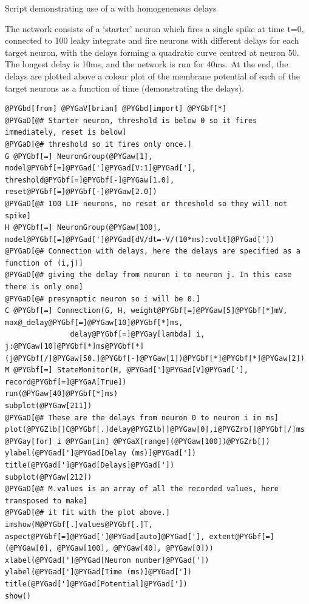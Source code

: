 \documentclass[letterpaper,10pt,english]{manual}
\begin{document}
Script demonstrating use of a \hyperlink{brian.Connection}{} with homogenenous delays

The network consists of a `starter' neuron which fires a single spike at time
t=0, connected to 100 leaky integrate and fire neurons with different delays
for each target neuron, with the delays forming a quadratic curve centred at
neuron 50. The longest delay is 10ms, and the network is run for 40ms. At
the end, the delays are plotted above a colour plot of the membrane potential
of each of the target neurons as a function of time (demonstrating the
delays).

\begin{Verbatim}[commandchars=@\[\]]
@PYGbd[from] @PYGaV[brian] @PYGbd[import] @PYGbf[*]
@PYGaD[@# Starter neuron, threshold is below 0 so it fires immediately, reset is below]
@PYGaD[@# threshold so it fires only once.]
G @PYGbf[=] NeuronGroup(@PYGaw[1], model@PYGbf[=]@PYGad[']@PYGad[V:1]@PYGad['], threshold@PYGbf[=]@PYGbf[-]@PYGaw[1.0], reset@PYGbf[=]@PYGbf[-]@PYGaw[2.0])
@PYGaD[@# 100 LIF neurons, no reset or threshold so they will not spike]
H @PYGbf[=] NeuronGroup(@PYGaw[100], model@PYGbf[=]@PYGad[']@PYGad[dV/dt=-V/(10*ms):volt]@PYGad['])
@PYGaD[@# Connection with delays, here the delays are specified as a function of (i,j)]
@PYGaD[@# giving the delay from neuron i to neuron j. In this case there is only one]
@PYGaD[@# presynaptic neuron so i will be 0.]
C @PYGbf[=] Connection(G, H, weight@PYGbf[=]@PYGaw[5]@PYGbf[*]mV, max@_delay@PYGbf[=]@PYGaw[10]@PYGbf[*]ms,
               delay@PYGbf[=]@PYGay[lambda] i, j:@PYGaw[10]@PYGbf[*]ms@PYGbf[*](j@PYGbf[/]@PYGaw[50.]@PYGbf[-]@PYGaw[1])@PYGbf[*]@PYGbf[*]@PYGaw[2])
M @PYGbf[=] StateMonitor(H, @PYGad[']@PYGad[V]@PYGad['], record@PYGbf[=]@PYGaA[True])
run(@PYGaw[40]@PYGbf[*]ms)
subplot(@PYGaw[211])
@PYGaD[@# These are the delays from neuron 0 to neuron i in ms]
plot(@PYGZlb[]C@PYGbf[.]delay@PYGZlb[]@PYGaw[0],i@PYGZrb[]@PYGbf[/]ms @PYGay[for] i @PYGan[in] @PYGaX[range](@PYGaw[100])@PYGZrb[])
ylabel(@PYGad[']@PYGad[Delay (ms)]@PYGad['])
title(@PYGad[']@PYGad[Delays]@PYGad['])
subplot(@PYGaw[212])
@PYGaD[@# M.values is an array of all the recorded values, here transposed to make]
@PYGaD[@# it fit with the plot above.]
imshow(M@PYGbf[.]values@PYGbf[.]T, aspect@PYGbf[=]@PYGad[']@PYGad[auto]@PYGad['], extent@PYGbf[=](@PYGaw[0], @PYGaw[100], @PYGaw[40], @PYGaw[0]))
xlabel(@PYGad[']@PYGad[Neuron number]@PYGad['])
ylabel(@PYGad[']@PYGad[Time (ms)]@PYGad['])
title(@PYGad[']@PYGad[Potential]@PYGad['])
show()
\end{Verbatim}
\end{document}
